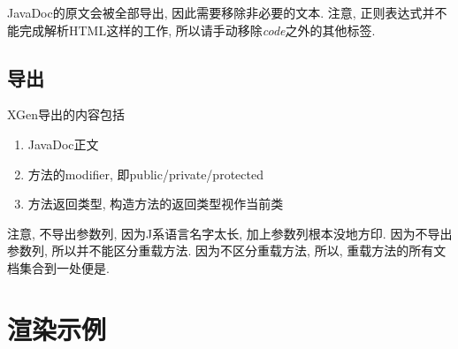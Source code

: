 JavaDoc的原文会被全部导出, 因此需要移除非必要的文本.
注意, 正则表达式并不能完成解析HTML这样的工作, 所以请手动移除\emph{code}之外的其他标签.

\section{导出}

XGen导出的内容包括

\begin{centering}
    \begin{enumerate}
        \item JavaDoc正文
        \item 方法的modifier, 即public/private/protected
        \item 方法返回类型, 构造方法的返回类型视作当前类
    \end{enumerate}
\end{centering}

注意, 不导出参数列, 因为J系语言名字太长, 加上参数列根本没地方印.
因为不导出参数列, 所以并不能区分重载方法.
因为不区分重载方法, 所以, 重载方法的所有文档集合到一处便是.

\chapter{渲染示例}


